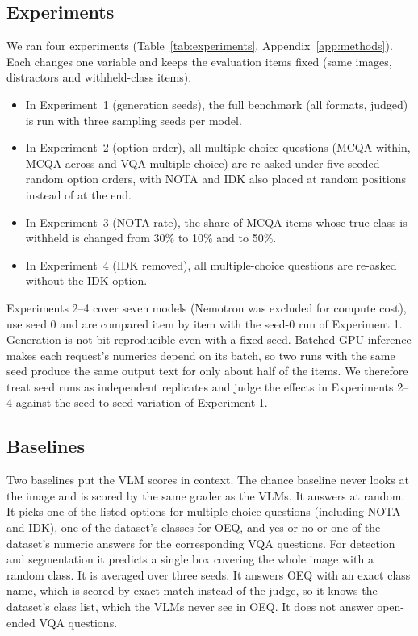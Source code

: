 \documentclass[10pt,letterpaper]{article}
\begin{document}
\subsection{Experiments}
\label{sec:stat_experiments}
We ran four experiments (Table~\ref{tab:experiments}, Appendix~\ref{app:methods}). Each changes one variable and keeps the evaluation items fixed (same images, distractors and withheld-class items).
\begin{itemize}
    \item In Experiment~1 (generation seeds), the full benchmark (all formats, judged) is run with three sampling seeds per model.
    \item In Experiment~2 (option order), all multiple-choice questions (MCQA within, MCQA across and VQA multiple choice) are re-asked under five seeded random option orders, with NOTA and IDK also placed at random positions instead of at the end.
    \item In Experiment~3 (NOTA rate), the share of MCQA items whose true class is withheld is changed from 30\% to 10\% and to 50\%.
    \item In Experiment~4 (IDK removed), all multiple-choice questions are re-asked without the IDK option.
\end{itemize}
Experiments 2--4 cover seven models (Nemotron was excluded for compute cost), use seed 0 and are compared item by item with the seed-0 run of Experiment 1. Generation is not bit-reproducible even with a fixed seed. Batched GPU inference makes each request's numerics depend on its batch, so two runs with the same seed produce the same output text for only about half of the items. We therefore treat seed runs as independent replicates and judge the effects in Experiments 2--4 against the seed-to-seed variation of Experiment 1.

\subsection{Baselines}
\label{sec:baselines}
Two baselines put the VLM scores in context. The chance baseline never looks at the image and is scored by the same grader as the VLMs.
It answers at random. It picks one of the listed options for multiple-choice questions (including NOTA and IDK), one of the dataset's classes for OEQ, and yes or no or one of the dataset's numeric answers for the corresponding VQA questions. For detection and segmentation it predicts a single box covering the whole image with a random class. It is averaged over three seeds. It answers OEQ with an exact class name, which is scored by exact match instead of the judge, so it knows the dataset's class list, which the VLMs never see in OEQ. It does not answer open-ended VQA questions.
\end{document}
